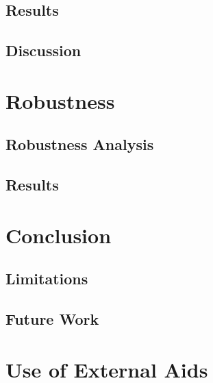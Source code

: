 \documentclass[a4paper,11pt]{article}
\theoremstyle{definition}
\begin{document}
\subsection{Results}

\subsection{Discussion}


\section{Robustness}

\subsection{Robustness Analysis}

\subsection{Results}


\section{Conclusion}

\subsection{Limitations}

\subsection{Future Work}


\section*{Use of External Aids}




\end{document}
